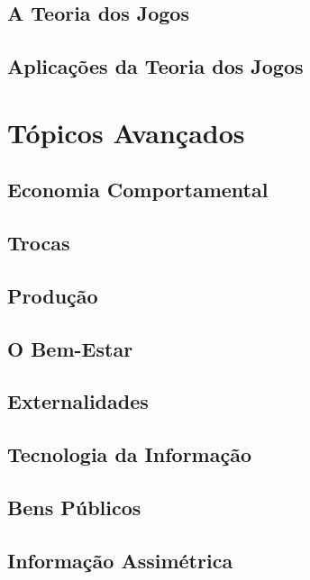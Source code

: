 \documentclass[a4paper,11pt,oneside]{book}
\theoremstyle{definition}
\theoremstyle{break}
\begin{document}
\chapter{A Teoria dos Jogos}

\chapter{Aplicações da Teoria dos Jogos}

\part{Tópicos Avançados}

\chapter{Economia Comportamental}

\chapter{Trocas}

\chapter{Produção}

\chapter{O Bem-Estar}

\chapter{Externalidades}

\chapter{Tecnologia da Informação}

\chapter{Bens Públicos}

\chapter{Informação Assimétrica}
\end{document}
